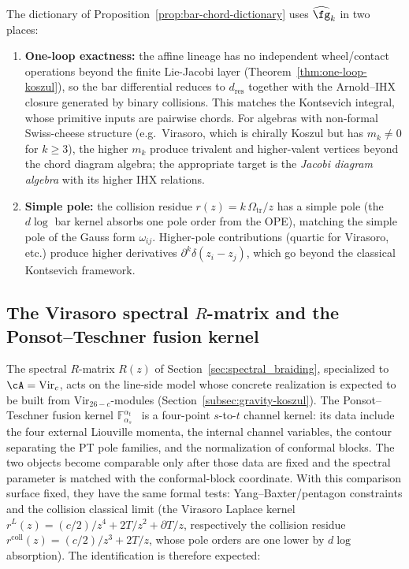 \begin{remark}
\label{rem:why-affine}
The dictionary of Proposition~\ref{prop:bar-chord-dictionary}
uses $\widehat{\fg}_k$ in two places:
\begin{enumerate}
\item \textbf{One-loop exactness:} the affine lineage has no
 independent wheel/contact operations beyond the finite
 Lie-Jacobi layer
 (Theorem~\ref{thm:one-loop-koszul}), so the bar differential
 reduces to $d_{\mathrm{res}}$ together with the Arnold--IHX
 closure generated by binary collisions. This
 matches the Kontsevich integral, whose primitive inputs are pairwise
 chords. For algebras with non-formal Swiss-cheese structure (e.g.\ Virasoro, which is chirally Koszul but has $m_k \neq 0$ for $k \geq 3$), the higher
 $m_k$ produce trivalent and higher-valent vertices beyond the
 chord diagram algebra; the appropriate target is the
 \emph{Jacobi diagram algebra} with its higher IHX relations.
\item \textbf{Simple pole:} the collision residue
 $r(z) = k\,\Omega_{\mathrm{tr}}/z$ has a simple pole (the $d\log$ bar kernel absorbs one pole order from the OPE), matching the
 simple pole of the Gauss form $\omega_{ij}$. Higher-pole
 contributions (quartic for Virasoro, etc.) produce higher
 derivatives $\partial^k \delta(z_i - z_j)$, which go beyond
 the classical Kontsevich framework.
\end{enumerate}
\end{remark}


\subsection{The Virasoro spectral $R$-matrix and the
Ponsot--Teschner fusion kernel}
\label{subsec:virasoro-R-PT}

\providecommand{\PT}{\mathrm{PT}}

The spectral $R$-matrix $R(z)$ of Section~\ref{sec:spectral_braiding},
specialized to $\cA = \mathrm{Vir}_c$, acts on the line-side model
whose concrete realization is expected to be built from
$\mathrm{Vir}_{26-c}$-modules (Section~\ref{subsec:gravity-koszul}).
The Ponsot--Teschner fusion kernel
$\mathbb{F}_{\alpha_s}^{\alpha_t}$~\cite{PT01} is a four-point
$s$-to-$t$ channel kernel: its data include the four external
Liouville momenta, the internal channel variables, the contour
separating the PT pole families, and the normalization of conformal
blocks. The two objects become comparable only after those data are
fixed and the spectral parameter is matched with the conformal-block
coordinate. With this comparison surface fixed, they have the same
formal tests: Yang--Baxter/pentagon constraints and the collision
classical limit (the Virasoro Laplace kernel
$r^L(z) = (c/2)/z^4 + 2T/z^2 + \partial T/z$, respectively the
collision residue $r^{\mathrm{coll}}(z) = (c/2)/z^3 + 2T/z$, whose pole
orders are one lower by $d\log$ absorption). The identification is
therefore expected:

